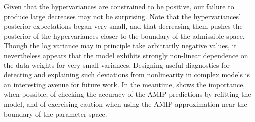 Given that the hypervariances are constrained to be positive, our failure to
produce large decreases may not be surprising. Note that the hypervariances'
posterior expectations began very small, and that decreasing them pushes the
posterior of the hypervariances closer to the boundary of the admissible space.
Though the log variance may in principle take arbitrarily negative values, it
nevertheless appears that the model exhibits strongly non-linear dependence on
the data weights for very small variances. Designing useful diagnostics for
detecting and explaining such deviations from nonlinearity in complex models is
an interesting avenue for future work. In the meantime,
 shows the importance, when possible, of
checking the accuracy of the AMIP predictions by refitting the model, and of
exercising caution when using the AMIP approximation near the boundary of the
parameter space.
